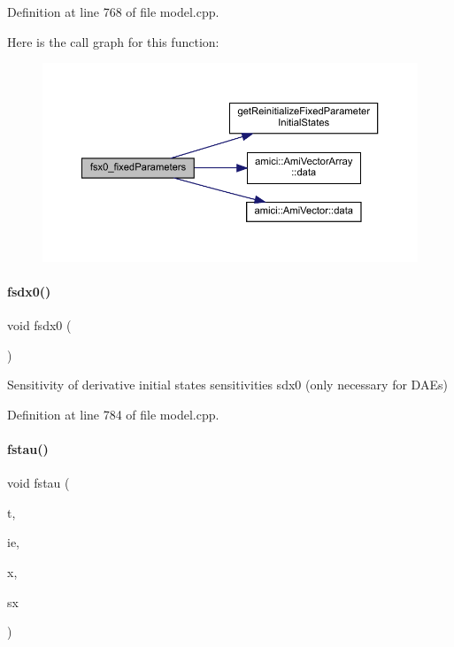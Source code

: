 Definition at line 768 of file model.\+cpp.

Here is the call graph for this function\+:
\nopagebreak
\begin{figure}[H]
\begin{center}
\leavevmode
\includegraphics[width=350pt]{classamici_1_1_model_acd951497e01220e545bbb238cc48e7bb_cgraph}
\end{center}
\end{figure}
\mbox{\label{classamici_1_1_model_a946b60982bd7321bcc2bdae10ea8358f}} 
\paragraph{\texorpdfstring{fsdx0()}{fsdx0()}}
{\footnotesize\ttfamily void fsdx0 (\begin{DoxyParamCaption}{ }\end{DoxyParamCaption})\hspace{0.3cm}{\ttfamily [virtual]}}

Sensitivity of derivative initial states sensitivities sdx0 (only necessary for D\+A\+Es) 

Definition at line 784 of file model.\+cpp.

\mbox{\label{classamici_1_1_model_a382cd2049c70f0dd4aafe483e4a50cff}} 
\paragraph{\texorpdfstring{fstau()}{fstau()}\hspace{0.1cm}{\footnotesize\ttfamily [1/2]}}
{\footnotesize\ttfamily void fstau (\begin{DoxyParamCaption}\item[{const \mbox{\hyperlink{namespaceamici_a1bdce28051d6a53868f7ccbf5f2c14a3}{realtype}}}]{t,  }\item[{const int}]{ie,  }\item[{const \mbox{\hyperlink{classamici_1_1_ami_vector}{Ami\+Vector}} $\ast$}]{x,  }\item[{const \mbox{\hyperlink{classamici_1_1_ami_vector_array}{Ami\+Vector\+Array}} $\ast$}]{sx }\end{DoxyParamCaption})}

